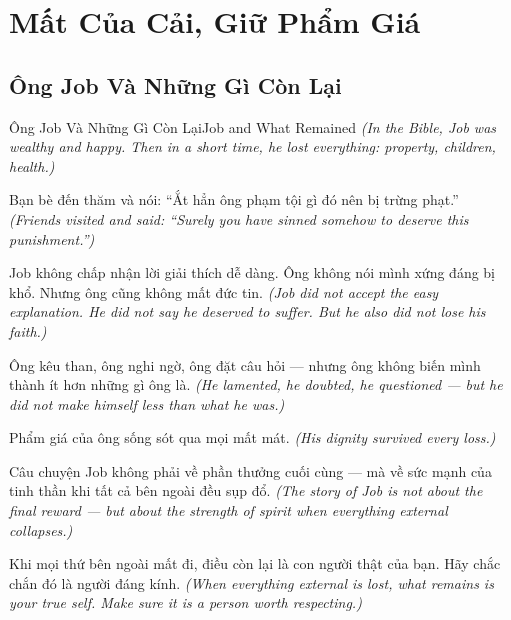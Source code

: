 \chapter{Mất Của Cải, Giữ Phẩm Giá}

\section{Ông Job Và Những Gì Còn Lại}
\begin{truyen}{Ông Job Và Những Gì Còn Lại}{Job and What Remained}
\textit{(In the Bible, Job was wealthy and happy. Then in a short time, he lost everything: property, children, health.)}

Bạn bè đến thăm và nói: ``Ắt hẳn ông phạm tội gì đó nên bị trừng phạt.''
\textit{(Friends visited and said: ``Surely you have sinned somehow to deserve this punishment.'')}

Job không chấp nhận lời giải thích dễ dàng. Ông không nói mình xứng đáng bị khổ. Nhưng ông cũng không mất đức tin.
\textit{(Job did not accept the easy explanation. He did not say he deserved to suffer. But he also did not lose his faith.)}

Ông kêu than, ông nghi ngờ, ông đặt câu hỏi — nhưng ông không biến mình thành ít hơn những gì ông là.
\textit{(He lamented, he doubted, he questioned — but he did not make himself less than what he was.)}

Phẩm giá của ông sống sót qua mọi mất mát.
\textit{(His dignity survived every loss.)}

Câu chuyện Job không phải về phần thưởng cuối cùng — mà về sức mạnh của tinh thần khi tất cả bên ngoài đều sụp đổ.
\textit{(The story of Job is not about the final reward — but about the strength of spirit when everything external collapses.)}

\end{truyen}

\begin{baihoc}
Khi mọi thứ bên ngoài mất đi, điều còn lại là con người thật của bạn. Hãy chắc chắn đó là người đáng kính.
\textit{(When everything external is lost, what remains is your true self. Make sure it is a person worth respecting.)}
\end{baihoc}
\ngancach

